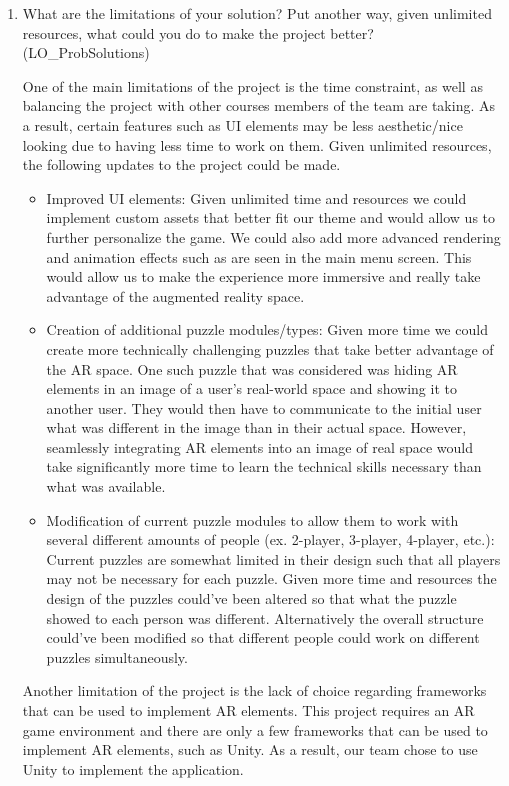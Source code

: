 \documentclass[12pt, titlepage]{article}
\begin{document}
\begin{enumerate}
  \item What are the limitations of your solution?  Put another way, given
  unlimited resources, what could you do to make the project better? (LO\_ProbSolutions)

One of the main limitations of the project is the time constraint, as well as balancing the project with other courses members of the team are taking. As a result, certain features such as UI elements may be less aesthetic/nice looking due to having less time to work on them. Given unlimited resources, the following updates to the project could be made.

\begin{itemize}
    \item Improved UI elements: Given unlimited time and resources we could implement custom assets that better fit our theme and would allow us to further personalize the game. We could also add more advanced rendering and animation effects such as are seen in the main menu screen. This would allow us to make the experience more immersive and really take advantage of the augmented reality space.
    \item Creation of additional puzzle modules/types: Given more time we could create more technically challenging puzzles that take better advantage of the AR space. One such puzzle that was considered was hiding AR elements in an image of a user's real-world space and showing it to another user. They would then have to communicate to the initial user what was different in the image than in their actual space. However, seamlessly integrating AR elements into an image of real space would take significantly more time to learn the technical skills necessary than what was available.
    \item Modification of current puzzle modules to allow them to work with several different amounts of people (ex. 2-player, 3-player, 4-player, etc.): Current puzzles are somewhat limited in their design such that all players may not be necessary for each puzzle. Given more time and resources the design of the puzzles could've been altered so that what the puzzle showed to each person was different. Alternatively the overall structure could've been modified so that different people could work on different puzzles simultaneously.
\end{itemize}

Another limitation of the project is the lack of choice regarding frameworks that can be used to implement AR elements. This project requires an AR game environment and there are only a few frameworks that can be used to implement AR elements, such as Unity. As a result, our team chose to use Unity to implement the application.
  

\end{enumerate}
\end{document}

